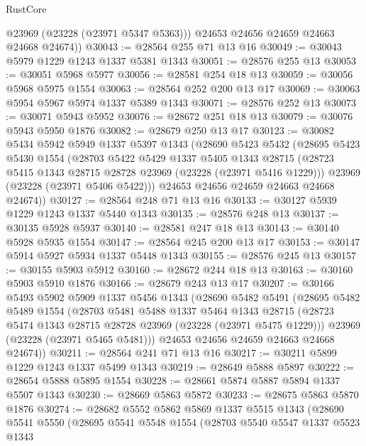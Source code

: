 \begin{lexlean}{RustCore}
\begin{coremodule}
          @23969
          (@23228 (@23971 @5347 @5363)))
        @24653
        @24656
        @24659
        @24663
        @24668
        @24674))
@30043 := @28564 @255 @71 @13 @16
@30049 := @30043 @5979 @1229 @1243 @1337 @5381 @1343
@30051 := @28576 @255 @13
@30053 := @30051 @5968 @5977
@30056 := @28581 @254 @18 @13
@30059 := @30056 @5968 @5975 @1554
@30063 := @28564 @252 @200 @13 @17
@30069 := @30063 @5954 @5967 @5974 @1337 @5389 @1343
@30071 := @28576 @252 @13
@30073 := @30071 @5943 @5952
@30076 := @28672 @251 @18 @13
@30079 := @30076 @5943 @5950 @1876
@30082 := @28679 @250 @13 @17
@30123 := @30082
    @5434
    @5942
    @5949
    @1337
    @5397
    @1343
    (@28690
      @5423
      @5432
      (@28695
        @5423
        @5430
        @1554
        (@28703
          @5422
          @5429
          @1337
          @5405
          @1343
          @28715
          (@28723 @5415 @1343 @28715 @28728 @23969 (@23228 (@23971 @5416 @1229)))
          @23969
          (@23228 (@23971 @5406 @5422)))
        @24653
        @24656
        @24659
        @24663
        @24668
        @24674))
@30127 := @28564 @248 @71 @13 @16
@30133 := @30127 @5939 @1229 @1243 @1337 @5440 @1343
@30135 := @28576 @248 @13
@30137 := @30135 @5928 @5937
@30140 := @28581 @247 @18 @13
@30143 := @30140 @5928 @5935 @1554
@30147 := @28564 @245 @200 @13 @17
@30153 := @30147 @5914 @5927 @5934 @1337 @5448 @1343
@30155 := @28576 @245 @13
@30157 := @30155 @5903 @5912
@30160 := @28672 @244 @18 @13
@30163 := @30160 @5903 @5910 @1876
@30166 := @28679 @243 @13 @17
@30207 := @30166
    @5493
    @5902
    @5909
    @1337
    @5456
    @1343
    (@28690
      @5482
      @5491
      (@28695
        @5482
        @5489
        @1554
        (@28703
          @5481
          @5488
          @1337
          @5464
          @1343
          @28715
          (@28723 @5474 @1343 @28715 @28728 @23969 (@23228 (@23971 @5475 @1229)))
          @23969
          (@23228 (@23971 @5465 @5481)))
        @24653
        @24656
        @24659
        @24663
        @24668
        @24674))
@30211 := @28564 @241 @71 @13 @16
@30217 := @30211 @5899 @1229 @1243 @1337 @5499 @1343
@30219 := @28649 @5888 @5897
@30222 := @28654 @5888 @5895 @1554
@30228 := @28661 @5874 @5887 @5894 @1337 @5507 @1343
@30230 := @28669 @5863 @5872
@30233 := @28675 @5863 @5870 @1876
@30274 := @28682
    @5552
    @5862
    @5869
    @1337
    @5515
    @1343
    (@28690
      @5541
      @5550
      (@28695
        @5541
        @5548
        @1554
        (@28703
          @5540
          @5547
          @1337
          @5523
          @1343

\end{coremodule}
\end{lexlean}
